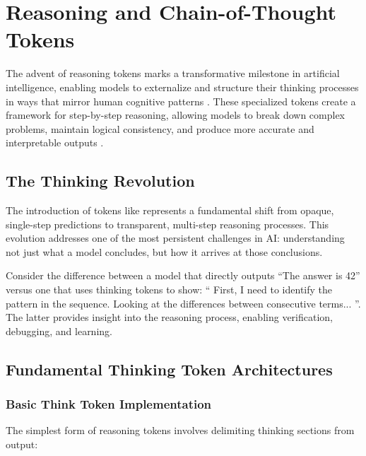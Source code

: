 \section{Reasoning and Chain-of-Thought Tokens}

The advent of reasoning tokens marks a transformative milestone in artificial intelligence, enabling models to externalize and structure their thinking processes in ways that mirror human cognitive patterns \citep{wei2022chain, kojima2022large}. These specialized tokens create a framework for step-by-step reasoning, allowing models to break down complex problems, maintain logical consistency, and produce more accurate and interpretable outputs \citep{zhou2022least, yao2024tree}.

\subsection{The Thinking Revolution}

The introduction of tokens like  represents a fundamental shift from opaque, single-step predictions to transparent, multi-step reasoning processes. This evolution addresses one of the most persistent challenges in AI: understanding not just what a model concludes, but how it arrives at those conclusions.

Consider the difference between a model that directly outputs ``The answer is 42'' versus one that uses thinking tokens to show: `` First, I need to identify the pattern in the sequence. Looking at the differences between consecutive terms... ''. The latter provides insight into the reasoning process, enabling verification, debugging, and learning.

\subsection{Fundamental Thinking Token Architectures}

\subsubsection{Basic Think Token Implementation}

The simplest form of reasoning tokens involves delimiting thinking sections from output:

